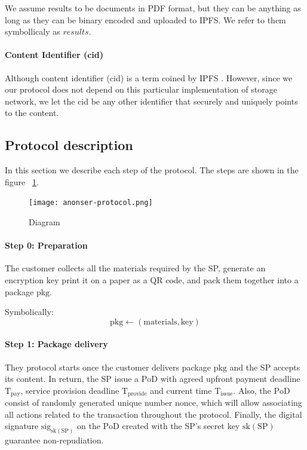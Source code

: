 \documentclass{ieeeaccess}
\begin{document}
We assume results to be documents in PDF format, but they can be
anything as long as they can be binary encoded and uploaded to IPFS. We
refer to them symbollicaly as \(results\).

\paragraph{Content Identifier (cid)}\label{content-identifier-cid}

Although content identifier (cid) is a term coined by IPFS
\cite{Contenta59}. However, since we our protocol does not depend on
this particular implementation of storage network, we let the cid be any
other identifier that securely and uniquely points to the content.

\subsection{Protocol description}\label{protocol-description}

In this section we describe each step of the protocol. The steps are
shown in the figure ~\ref{fig:protocol-diagram}.

\begin{figure}[h!]
\texttt{[image: anonser-protocol.png]}
\centering
\caption{Diagram}
\label{fig:protocol-diagram}
\end{figure}

\paragraph{Step 0: Preparation}\label{step-0-preparation}

The customer collects all the $\mathrm{materials}$ required by the SP, generate an encryption $\mathrm{key}$ print it on a paper as a QR code, and pack them together into a package $\mathrm{pkg}$.

Symbolically: \[
\mathrm{pkg} \gets (\mathrm{materials}, \mathrm{key})
\]

\paragraph{Step 1: Package delivery}\label{step-1-package-delivery}

They protocol starts once the customer delivers package $\mathrm{pkg}$ and the SP accepts its content. In return, the SP issue a $\mathrm{PoD}$ with agreed upfront payment deadline $\mathrm{T}_\mathrm{pay}$, service provision deadline $\mathrm{T}_\mathrm{provide}$ and current time $\mathrm{T}_\mathrm{issue}$. Also, the $\mathrm{PoD}$ consist of randomly generated unique number $\mathrm{nonce}$, which will allow associating all actions related to the transaction throughout the protocol. Finally, the digital signature $\mathrm{sig}_{\mathrm{sk}(\mathrm{SP})}$ on the $\mathrm{PoD}$ created with the SP's secret key $\mathrm{sk}(\mathrm{SP})$ guarantee non-repudiation.
\end{document}
